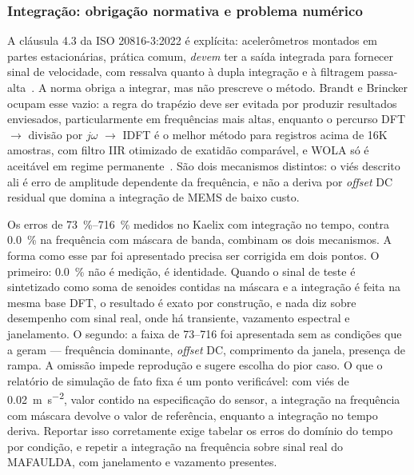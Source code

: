 \documentclass[11pt,a4paper]{article}
\begin{document}
\subsubsection{Integração: obrigação normativa e problema numérico}

A cláusula 4.3 da ISO 20816-3:2022 é explícita: acelerômetros montados em partes
estacionárias, prática comum, \emph{devem} ter a saída integrada para fornecer sinal
de velocidade, com ressalva quanto à dupla integração e à filtragem
passa-alta~\cite{iso208163_2022}. A norma obriga a integrar, mas não prescreve o método.
Brandt e Brincker ocupam esse vazio: a regra do trapézio deve ser evitada por
produzir resultados enviesados, particularmente em frequências mais altas, enquanto o
percurso DFT $\rightarrow$ divisão por $j\omega$ $\rightarrow$ IDFT é o melhor método para
registros acima de 16K amostras, com filtro IIR otimizado de exatidão comparável, e WOLA
só é aceitável em regime permanente~\cite{brandt2014}. São dois mecanismos distintos: o
viés descrito ali é erro de amplitude dependente da frequência, e não a deriva por
\emph{offset} DC residual que domina a integração de MEMS de baixo custo.

Os erros de \SIrange{73}{716}{\percent} medidos no Kaelix com integração no tempo,
contra \SI{0,0}{\percent} na frequência com máscara de banda, combinam os dois mecanismos.
A forma como esse par foi apresentado precisa ser corrigida em dois pontos. O
primeiro: \SI{0,0}{\percent} não é medição, é identidade. Quando o sinal de teste é
sintetizado como soma de senoides contidas na máscara e a integração é feita na mesma base
DFT, o resultado é exato por construção, e nada diz sobre desempenho com sinal real, onde
há transiente, vazamento espectral e janelamento. O segundo: a faixa de \numrange{73}{716}
foi apresentada sem as condições que a geram --- frequência dominante, \emph{offset} DC,
comprimento da janela, presença de rampa. A omissão impede reprodução e sugere escolha do
pior caso. O que o relatório de simulação de fato fixa é um ponto verificável: com viés de
\SI{0,02}{\meter\per\second\squared}, valor contido na especificação do sensor, a
integração na frequência com máscara devolve o valor de referência, enquanto a integração
no tempo deriva. Reportar isso corretamente exige tabelar os erros do domínio do tempo por
condição, e repetir a integração na frequência sobre sinal real do MAFAULDA, com
janelamento e vazamento presentes.
\end{document}
